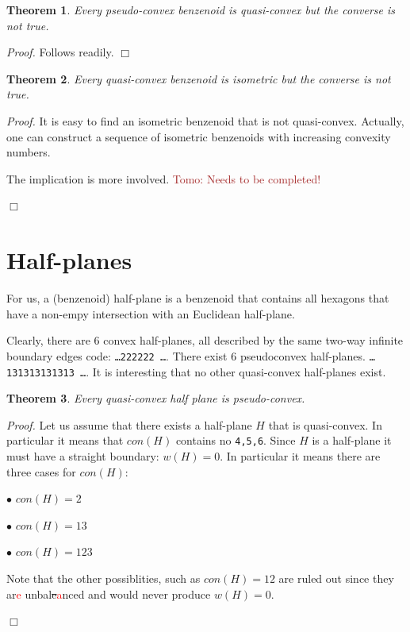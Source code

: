 \documentclass[a4paper,10pt]{article}
\newcounter{theorem}
\newtheorem{theorem}{Theorem}[section]
\newenvironment{proof}{\medskip\emph{Proof.}}{\hfill$\Box$\medskip}
\newcommand\TODO[1]{\textcolor{red}{#1}}
\newcommand\Tomo[1]{\textcolor{brown}{Tomo: #1}}
\begin{document}
{\begin{theorem}
Every pseudo-convex benzenoid is quasi-convex  but the converse is not true.
\end{theorem}

\begin{proof}
Follows readily.
\end{proof}


\begin{theorem}
Every quasi-convex benzenoid is isometric but the converse is not true.
\end{theorem}
\begin{proof}
It is easy to find an isometric benzenoid that is not quasi-convex. Actually, one can construct a sequence of isometric benzenoids with
increasing convexity numbers.

The implication is more involved.
\Tomo{Needs to be completed!}


\end{proof}


\section{Half-planes}

For us, a (benzenoid) half-plane is a benzenoid that contains all hexagons that have a non-empy intersection with an Euclidean half-plane. 

Clearly, there are 6 convex half-planes, all described by the same two-way infinite boundary edges code: {\tt \ldots 222222 \ldots}. 
There exist 6 pseudoconvex half-planes. {\tt \ldots 131313131313 \ldots}. It is interesting that no other quasi-convex half-planes exist.

\begin{theorem}
Every quasi-convex half plane is pseudo-convex.
\end{theorem}
\begin{proof}
Let us assume that there exists a half-plane $H$ that is quasi-convex. In particular it means that $con(H)$ contains no {\tt 4,5,6}. Since $H$ is a half-plane it must have a straight boundary: $w(H) = 0$.  In particular it means there are three cases for $con(H)$:

$\bullet$ $con(H) = 2$

$\bullet$ $con(H) = 13$

$\bullet$ $con(H) = 123$

Note that the other possiblities, such as $con(H) = 12$ are ruled out since they ar\TODO{e} unbal\sout{e}\TODO{a}nced and would never produce $w(H) = 0$.



\end{proof}}
\end{document}
